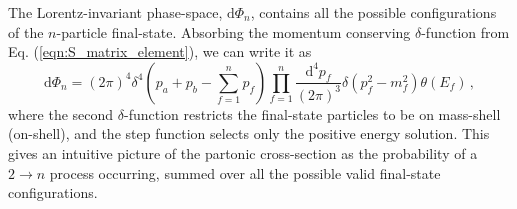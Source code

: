 \documentclass[main.tex]{subfiles}
\begin{document}
    The Lorentz-invariant phase-space, $\mathrm{d}\Phi_{n}$,
    contains all the possible
    configurations of the $n$-particle final-state.
    Absorbing the momentum conserving $\delta$-function
    from Eq. (\ref{eqn:S_matrix_element}),
    we can write it as
    \begin{equation}\label{eqn:dlips_4d}
        \mathrm{d}\Phi_{n} = (2\pi)^{4}\delta^{4}\left(p_{a} + p_{b} - \sum_{f=1}^{n} p_{f}\right) \prod_{f=1}^{n} \dfrac{\mathrm{d}^{4}p_{f}}{(2\pi)^{3}}\delta(p_{f}^{2} - m_{f}^{2})\theta(E_{f}) \, ,
    \end{equation}
    where the second $\delta$-function restricts
    the final-state particles to be on mass-shell
    (on-shell), and the step function selects only
    the positive energy solution.
    This gives an intuitive picture of the partonic
    cross-section as the probability of a $2\rightarrow n$
    process occurring, summed over all the possible
    valid final-state configurations.
\end{document}

